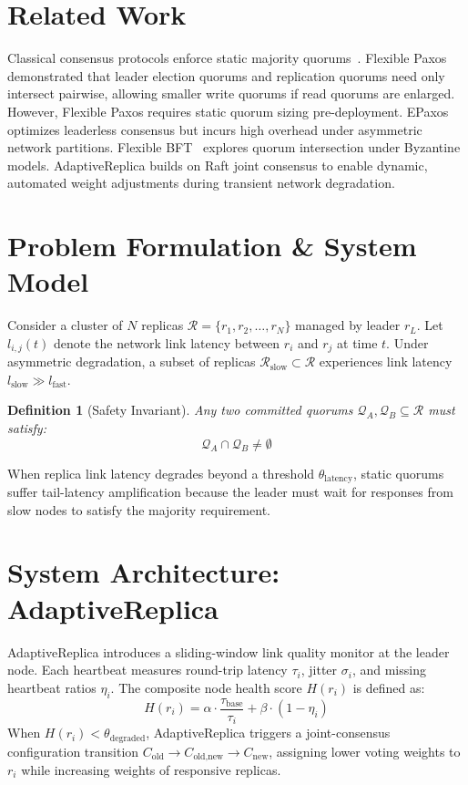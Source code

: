 \documentclass[journal]{IEEEtran}
\newtheorem{definition}{Definition}
\begin{document}
\section{Related Work}
Classical consensus protocols enforce static majority quorums~\cite{lamport1998part, ongaro2014search}. Flexible Paxos~\cite{howard2016flexible} demonstrated that leader election quorums and replication quorums need only intersect pairwise, allowing smaller write quorums if read quorums are enlarged. However, Flexible Paxos requires static quorum sizing pre-deployment. EPaxos~\cite{moraru2013there} optimizes leaderless consensus but incurs high overhead under asymmetric network partitions. Flexible BFT~\cite{malkhi2019flexible} explores quorum intersection under Byzantine models. AdaptiveReplica builds on Raft joint consensus to enable dynamic, automated weight adjustments during transient network degradation.

\section{Problem Formulation \& System Model}
Consider a cluster of $N$ replicas $\mathcal{R} = \{r_1, r_2, \dots, r_N\}$ managed by leader $r_L$. Let $l_{i,j}(t)$ denote the network link latency between $r_i$ and $r_j$ at time $t$. Under asymmetric degradation, a subset of replicas $\mathcal{R}_{\text{slow}} \subset \mathcal{R}$ experiences link latency $l_{\text{slow}} \gg l_{\text{fast}}$.

\begin{definition}[Safety Invariant]
Any two committed quorums $\mathcal{Q}_A, \mathcal{Q}_B \subseteq \mathcal{R}$ must satisfy:
\begin{equation}
\mathcal{Q}_A \cap \mathcal{Q}_B \neq \emptyset
\end{equation}
\end{definition}

When replica link latency degrades beyond a threshold $\theta_{\text{latency}}$, static quorums suffer tail-latency amplification because the leader must wait for responses from slow nodes to satisfy the majority requirement.

\section{System Architecture: AdaptiveReplica}
AdaptiveReplica introduces a sliding-window link quality monitor at the leader node. Each heartbeat measures round-trip latency $\tau_i$, jitter $\sigma_i$, and missing heartbeat ratios $\eta_i$. The composite node health score $H(r_i)$ is defined as:
\begin{equation}
H(r_i) = \alpha \cdot \frac{\tau_{\text{base}}}{\tau_i} + \beta \cdot (1 - \eta_i)
\end{equation}
When $H(r_i) < \theta_{\text{degraded}}$, AdaptiveReplica triggers a joint-consensus configuration transition $C_{\text{old}} \to C_{\text{old}, \text{new}} \to C_{\text{new}}$, assigning lower voting weights to $r_i$ while increasing weights of responsive replicas.
\end{document}
